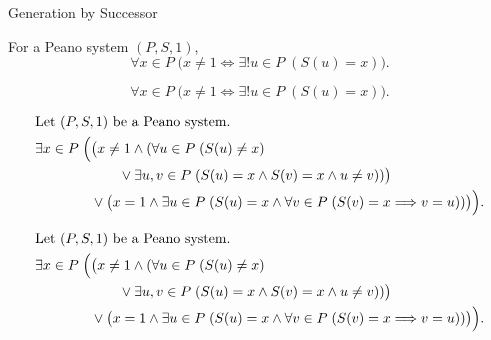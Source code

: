 \begin{topicbox}{Generation by Successor}
\begin{remark*}
For a Peano system $(P,S,1)$,
\[
\forall x \in P\;\bigl(x\neq 1 \Longleftrightarrow
\exists! u \in P\;(S(u)=x)\bigr).
\]
\end{remark*}

\begin{remark*}
\[
\forall x \in P\;\bigl(x\neq 1 \Longleftrightarrow
\exists! u \in P\;(S(u)=x)\bigr).
\]
\end{remark*}

\begin{remark*}
\[
\begin{aligned}
&\text{Let } (P,S,1) \text{ be a Peano system.}\\
&\exists x \in P\;\Bigl(
\bigl(x\neq 1 \land
(\forall u \in P\;(S(u)\neq x)\\
&\qquad\qquad\qquad\lor
\exists u,v \in P\;(S(u)=x \land S(v)=x \land u\neq v))\bigr)\\
&\qquad\qquad\lor
\bigl(x=1 \land \exists u \in P\;(S(u)=x \land
\forall v \in P\;(S(v)=x \Longrightarrow v=u))\bigr)
\Bigr).
\end{aligned}
\]
\end{remark*}

\begin{remark*}
\[
\begin{aligned}
&\text{Let } (P,S,1) \text{ be a Peano system.}\\
&\exists x \in P\;\Bigl(
\bigl(x\neq 1 \land
(\forall u \in P\;(S(u)\neq x)\\
&\qquad\qquad\qquad\lor
\exists u,v \in P\;(S(u)=x \land S(v)=x \land u\neq v))\bigr)\\
&\qquad\qquad\lor
\bigl(x=1 \land \exists u \in P\;(S(u)=x \land
\forall v \in P\;(S(v)=x \Longrightarrow v=u))\bigr)
\Bigr).
\end{aligned}
\]
\end{remark*}


\end{topicbox}
